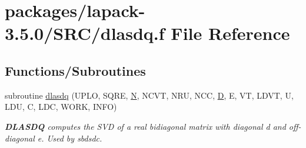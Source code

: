 \hypertarget{dlasdq_8f}{}\section{packages/lapack-\/3.5.0/\+S\+R\+C/dlasdq.f File Reference}
\label{dlasdq_8f}
\subsection*{Functions/\+Subroutines}
\begin{DoxyCompactItemize}
\item 
subroutine \hyperlink{group__auxOTHERauxiliary_gafc8e49b5fff31027da26e1856f8a9b25}{dlasdq} (U\+P\+L\+O, S\+Q\+R\+E, \hyperlink{polmisc_8c_a0240ac851181b84ac374872dc5434ee4}{N}, N\+C\+V\+T, N\+R\+U, N\+C\+C, \hyperlink{odrpack_8h_a7dae6ea403d00f3687f24a874e67d139}{D}, E, V\+T, L\+D\+V\+T, U, L\+D\+U, C, L\+D\+C, W\+O\+R\+K, I\+N\+F\+O)
\begin{DoxyCompactList}\small\item\em {\bfseries D\+L\+A\+S\+D\+Q} computes the S\+V\+D of a real bidiagonal matrix with diagonal d and off-\/diagonal e. Used by sbdsdc. \end{DoxyCompactList}\end{DoxyCompactItemize}
